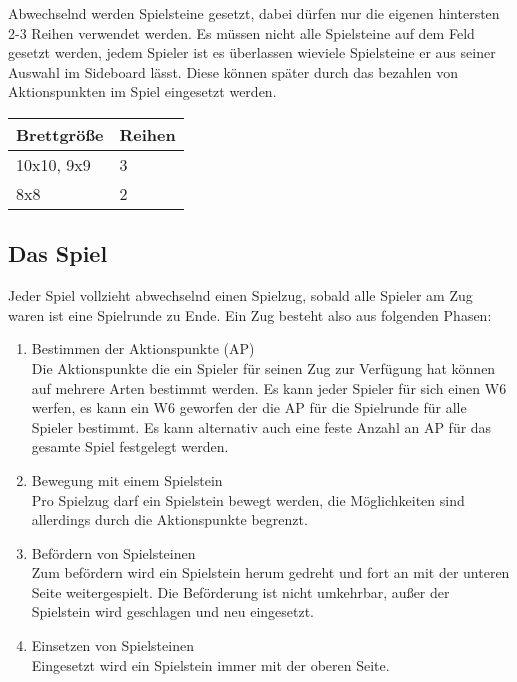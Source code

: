 \documentclass{article}
\begin{document}
	Abwechselnd werden Spielsteine gesetzt, dabei dürfen nur die eigenen
	hintersten 2-3 Reihen verwendet werden. Es müssen nicht alle Spielsteine
	auf dem Feld gesetzt werden, jedem Spieler ist es überlassen wieviele Spielsteine
	er aus seiner Auswahl im Sideboard lässt. Diese können später durch das bezahlen
	von Aktionspunkten im Spiel eingesetzt werden.
	
	\begin{tabular}{ll}
	\hline
	Brettgröße & Reihen \\ \hline
	10x10, 9x9 & 3 \\
	8x8        & 2 \\ 
	\end{tabular} 
	
	
\subsection{Das Spiel}

	Jeder Spiel vollzieht abwechselnd einen Spielzug, sobald alle Spieler am Zug waren
	ist eine Spielrunde zu Ende. Ein Zug besteht also aus folgenden Phasen:
	
	\begin{enumerate}
	\item Bestimmen der Aktionspunkte (AP) \\
		  Die Aktionspunkte die ein Spieler für seinen Zug zur Verfügung hat können auf mehrere Arten bestimmt werden.
		  Es kann jeder Spieler für sich einen W6 werfen, es kann ein W6 geworfen der die AP für die Spielrunde für alle Spieler bestimmt.
		  Es kann alternativ auch eine feste Anzahl an AP für das gesamte Spiel festgelegt werden.
		  
	\item Bewegung mit einem Spielstein \\
		  Pro Spielzug darf ein Spielstein bewegt werden, die Möglichkeiten sind allerdings durch die Aktionspunkte begrenzt.
		   
	\item Befördern von Spielsteinen \\
		  Zum befördern wird ein Spielstein herum gedreht und fort an mit der unteren Seite weitergespielt.
		  Die Beförderung ist nicht umkehrbar, außer der Spielstein wird geschlagen und neu eingesetzt.
		  
	\item Einsetzen von Spielsteinen \\
		  Eingesetzt wird ein Spielstein immer mit der oberen Seite.
	\end{enumerate}
\end{document}
